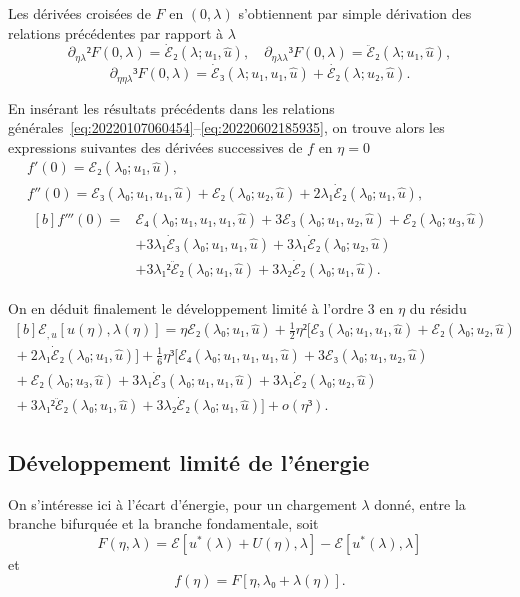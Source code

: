 \documentclass[12pt, final]{scrartcl}
\theoremstyle{definition}
\begin{document}
Les dérivées croisées de \(F\) en \((0, λ)\) s'obtiennent par simple dérivation
des relations précédentes par rapport à \(λ\)
\[∂_{ηλ}² F(0, λ) = \dot{ℰ}₂(λ; u₁, \hat{u}), \quad ∂_{ηλλ}³ F(0, λ) = \ddot{ℰ}₂(λ; u₁, \hat{u}),\]
\[∂_{ηηλ}³ F(0, λ) = \dot{ℰ}₃(λ; u₁, u₁, \hat{u}) + \dot{ℰ₂}(λ; u₂, \hat{u}).\]

En insérant les résultats précédents dans les relations
générales~\eqref{eq:20220107060454}--\eqref{eq:20220602185935}, on trouve alors
les expressions suivantes des dérivées successives de \(f\) en \(η = 0\)
\begin{gather*}
  f'(0) = ℰ₂(λ₀; u₁, \hat{u}),\\
  f''(0) = ℰ₃(λ₀; u₁, u₁, \hat{u}) + ℰ₂(λ₀; u₂, \hat{u}) + 2 λ₁ \dot{ℰ}₂(λ₀; u₁, \hat{u}),\\
  \begin{aligned}[b]
    f'''(0) ={}
    & ℰ₄(λ₀; u₁, u₁, u₁, \hat{u}) + 3ℰ₃(λ₀; u₁, u₂, \hat{u}) + ℰ₂(λ₀ ; u₃, \hat{u})\\
    & + 3λ₁ \dot{ℰ}₃(λ₀; u₁, u₁, \hat{u}) + 3λ₁ \dot{ℰ}₂(λ₀; u₂, \hat{u})\\
    & + 3 λ₁² \ddot{ℰ}₂(λ₀; u₁, \hat{u}) + 3 λ₂ \dot{ℰ}₂(λ₀; u₁, \hat{u}).
  \end{aligned}
\end{gather*}

On en déduit finalement le développement limité à l'ordre 3 en \(η\) du résidu
\begin{equation}
  \label{eq:20220107080901}
  \begin{gathered}[b]
    ℰ_{, u}[u(η), λ(η)] ={} η ℰ₂(λ₀; u₁, \hat{u}) + \tfrac{1}{2} η² \bigl[ℰ₃(λ₀; u₁, u₁, \hat{u})  + ℰ₂(λ₀; u₂, \hat{u})\\
    {} + 2 λ₁ \dot{ℰ}₂(λ₀; u₁, \hat{u})\bigr] + \tfrac{1}{6} η³ \bigl[ ℰ₄(λ₀; u₁, u₁, u₁, \hat{u}) + 3ℰ₃(λ₀; u₁, u₂, \hat{u})\\
    {} + ℰ₂(λ₀; u₃, \hat{u}) + 3λ₁ \dot{ℰ}₃(λ₀; u₁, u₁, \hat{u}) + 3λ₁ \dot{ℰ}₂(λ₀; u₂, \hat{u})\\
    {} + 3 λ₁² \ddot{ℰ}₂(λ₀; u₁, \hat{u}) + 3 λ₂ \dot{ℰ}₂(λ₀ ; u₁, \hat{u}) \bigr] + o(η³).
  \end{gathered}
\end{equation}

\subsection{Développement limité de l'énergie}
\label{sec:20220525053434}

On s'intéresse ici à l'écart d'énergie, pour un chargement \(λ\) donné, entre la
branche bifurquée et la branche fondamentale, soit
\begin{equation}
  F(η, λ) = ℰ[u^{\ast}(λ) + U(η), λ] - ℰ[u^{\ast}(λ), λ]
\end{equation}
et
\begin{equation}
  f(η) = F [η, λ₀ + λ(η)].
\end{equation}
\end{document}
